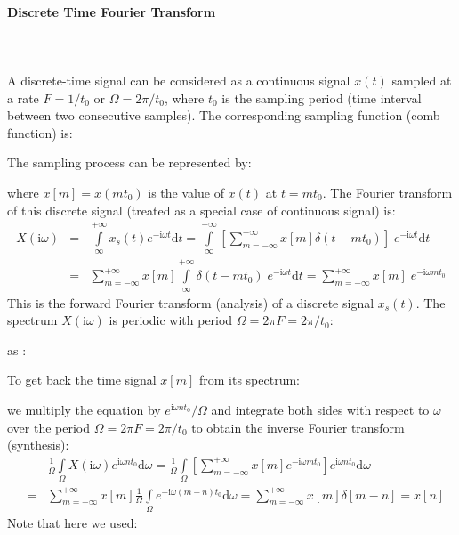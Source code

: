 	\paragraph{Discrete Time Fourier Transform}\mbox{}\\\\
	A discrete-time signal can be considered as a continuous signal $x(t)$ 
	sampled at a rate $F=1/t_0$ or $\Omega=2\pi/t_0$, where $t_0$ is the 
	sampling period (time interval between two consecutive samples). The
	corresponding sampling function (comb function) is:
	
	The sampling process can be represented by:
	
	where $x[m]=x(mt_0)$ is the value of $x(t)$ at $t=mt_0$. The Fourier transform of this discrete signal (treated as a special case of continuous signal) is:
	\begin{eqnarray}
		X(\mathrm{i}\omega) &=& \int\limits_\infty^{+\infty} x_s(t)e^{-\mathrm{i}\omega t} \mathrm{d}t
		=\int\limits_\infty^{+\infty} \left[\sum_{m=-\infty}^{+\infty} x[m]\delta(t-mt_0)\right]\;e^{-\mathrm{i}\omega t} \mathrm{d}t
		\nonumber \\
		&=&\sum_{m=-\infty}^{+\infty} x[m] \int\limits_\infty^{+\infty} \delta(t-mt_0)\;e^{-\mathrm{i}\omega t} \mathrm{d}t
	=\sum_{m=-\infty}^{+\infty} x[m]\; e^{-\mathrm{i}\omega mt_0} 
		\nonumber 
	\end{eqnarray}
	This is the forward Fourier transform (analysis) of a discrete signal $x_s(t)$. The spectrum $X(\mathrm{i}\omega)$ is periodic with period $\Omega=2\pi F=2\pi/t_0$:
	
	as :
	
	
	To get back the time signal $x[m]$ from its spectrum:
	
	we multiply the equation by $e^{\mathrm{i}\omega nt_0}/\Omega$ and integrate both sides with respect to $\omega$ over the period $\Omega=2\pi F=2\pi/t_0$	to obtain the inverse Fourier transform (synthesis):
	\begin{eqnarray}
	 & & \frac{1}{\Omega}\int\limits_\Omega X(\mathrm{i}\omega)e^{\mathrm{i}\omega nt_0} \mathrm{d}\omega
	=\frac{1}{\Omega}\int\limits_{\Omega} [\sum_{m=-\infty}^{+\infty} x[m] e^{-\mathrm{i}\omega mt_0}] 
		e^{\mathrm{i}\omega nt_0} \mathrm{d}\omega
		\nonumber \\
	&=&\sum_{m=-\infty}^{+\infty} x[m]\frac{1}{\Omega}\int\limits_\Omega e^{-\mathrm{i}\omega(m-n)t_0}\mathrm{d}\omega
	=\sum_{m=-\infty}^{+\infty} x[m] \delta[m-n]=x[n]	
		\nonumber
	\end{eqnarray}
	Note that here we used:
	
